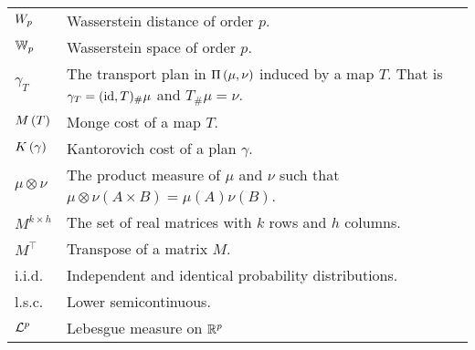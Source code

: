 \begin{tabular}{ l l }
	$W_{p}$ & Wasserstein distance of order $p$. \\	
	$\mathbb{W}_{p}$ & Wasserstein space of order $p$.\\
 	$\gamma_T$ & The transport plan in $\Pi\left(\mu, \nu\right)$ induced by a map $T$. That is $\gamma_T = (\mathrm{id}, T)_\#\mu$ and $T_\#\mu=\nu$. \\
	$M\left(T\right)$ & Monge cost of a map $T$. \\
	$K\left(\gamma\right)$ & Kantorovich cost of a plan $\gamma$. \\	
	$\mu \otimes \nu$ & The product measure of $\mu$ and $\nu$ such that $\mu \otimes \nu (A\times B)= \mu(A)\nu(B)$.\\
	$M^{k\times h}$ & The set of real matrices with $k$ rows and $h$ columns. \\
	$M^\top$ & Transpose of a matrix $M$. \\
	i.i.d. & Independent and identical probability distributions.\\
	l.s.c. & Lower semicontinuous. \\
	$\mathcal{L}^p$ & Lebesgue measure on $\mathbb{R}^p$
\end{tabular}

